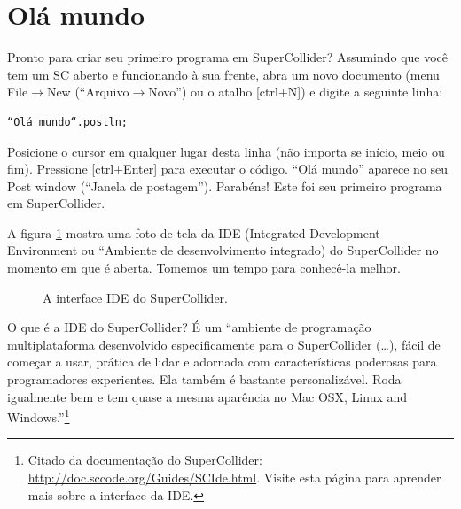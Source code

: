 \section{Olá mundo}

Pronto para criar seu primeiro programa em SuperCollider? Assumindo que você tem um SC aberto e funcionando à sua frente, abra um novo documento (menu File$\rightarrow$New (“Arquivo$\rightarrow$Novo”) ou o atalho [ctrl+N]) e digite a seguinte linha:

 
\begin{lstlisting}[style=SuperCollider-IDE, basicstyle=\scttfamily\footnotesize ]
“Olá mundo“.postln;
\end{lstlisting}
 
Posicione o cursor em qualquer lugar desta linha (não importa se início, meio ou fim). Pressione [ctrl+Enter] para executar o código. “Olá mundo” aparece no seu Post window (“Janela de postagem”). Parabéns! Este foi seu primeiro programa em SuperCollider.

 
\bigskip
{}
\bigskip
 

A figura \ref{fig:scidegui} mostra uma foto de tela da IDE (Integrated Development Environment ou “Ambiente de desenvolvimento integrado) do SuperCollider no momento em que é aberta. Tomemos um tempo para conhecê-la melhor.

\begin{figure}[t]
\centerline{}
\caption{A interface IDE do SuperCollider.}
\label{fig:scidegui}
\end{figure}

O que é a IDE do SuperCollider? É um “ambiente de programação multiplataforma desenvolvido especificamente para o SuperCollider (\dots), 
fácil de começar a usar, prática de lidar e adornada com características poderosas para programadores experientes. Ela também é bastante personalizável. Roda igualmente bem e tem quase a mesma aparência no 
Mac OSX, Linux and Windows.”\footnote{Citado da documentação do SuperCollider: \url{http://doc.sccode.org/Guides/SCIde.html}. Visite esta página para aprender mais sobre a interface da IDE.}

